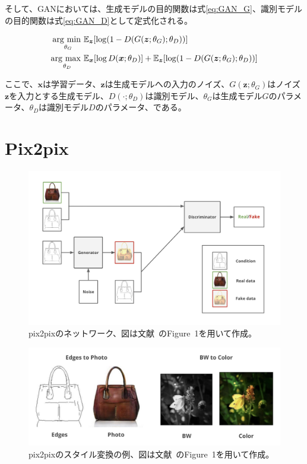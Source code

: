 そして、GANにおいては、生成モデルの目的関数は式\ref{eq:GAN_G}、識別モデルの目的関数は式\ref{eq:GAN_D}として定式化される。

\begin{align}
    \label{eq:GAN_G}
    \mathop{\rm arg~min~}\limits _{\theta_G}& \mathbb{E}_{\boldsymbol{z}}[\log (1-D(G(\boldsymbol{z};\theta_G);\theta_D))]\\
    \label{eq:GAN_D}
    \mathop{\rm arg~max~}\limits _{\theta_D}& \mathbb{E}_{\boldsymbol{x}}[\log D(\boldsymbol{x};\theta_D)]+\mathbb{E}_{\boldsymbol{z}}[\log (1-D(G(\boldsymbol{z};\theta_G);\theta_D))]
\end{align}


ここで、$\boldsymbol{x}$は学習データ、$\boldsymbol{z}$は生成モデルへの入力のノイズ、$G(\boldsymbol{z};\theta_G)$はノイズ$\boldsymbol{z}$を入力とする生成モデル、$D(\cdot;\theta_D)$は識別モデル、$\theta_G$は生成モデル$G$のパラメータ、$\theta_D$は識別モデル$D$のパラメータ、である。

\section{Pix2pix}

\begin{figure}[t]
\begin{center}
\includegraphics[width=\hsize]{figure/pix2pix_net.png}
\caption{pix2pixのネットワーク、図は文献~\cite{pix2pix}のFigure~1を用いて作成。}
\label{fig:pix2pix_net}
\end{center}
\end{figure}

\begin{figure}[t]
\begin{center}
\includegraphics[width=\hsize]{figure/pix2pix_img.png}
\caption{pix2pixのスタイル変換の例、図は文献~\cite{pix2pix}のFigure~1を用いて作成。}
\label{fig:pix2pix_img}
\end{center}
\end{figure}

